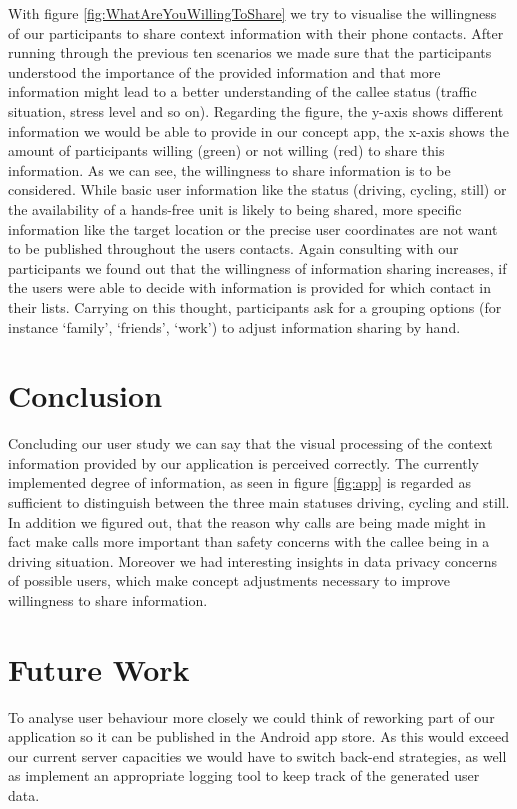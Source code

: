 \documentclass{sigchi}
\begin{document}
With figure \ref{fig:WhatAreYouWillingToShare} we try to visualise the willingness of our participants to share context information with their phone contacts. After running through the previous ten scenarios we made sure that the participants understood the importance of the provided information and that more information might lead to a better understanding of the callee status (traffic situation, stress level and so on). Regarding the figure, the y-axis shows different information we would be able to provide in our concept app, the x-axis shows the amount of participants willing (green) or not willing (red) to share this information. As we can see, the willingness to share information is to be considered. While basic user information like the status (driving, cycling, still) or the availability of a hands-free unit is likely to being shared, more specific information like the target location or the precise user coordinates are not want to be published throughout the users contacts. Again consulting with our participants we found out that the willingness of information sharing increases, if the users were able to decide with information is provided for which contact in their lists. Carrying on this thought, participants ask for a grouping options (for instance `family', `friends', `work') to adjust information sharing by hand.


\section{Conclusion}
Concluding our user study we can say that the visual processing of the context information provided by our application is perceived correctly. The currently implemented degree of information, as seen in figure \ref{fig:app} is regarded as sufficient to distinguish between the three main statuses driving, cycling and still. In addition we figured out, that the reason why calls are being made might in fact make calls more important than safety concerns with the callee being in a driving situation. Moreover we had interesting insights in data privacy concerns of possible users, which make concept adjustments necessary to improve willingness to share information.

\section{Future Work}
To analyse user behaviour more closely we could think of reworking part of our application so it can be published in the Android app store. As this would exceed our current server capacities we would have to switch back-end strategies, as well as implement an appropriate logging tool to keep track of the generated user data.

\balance{}


\balance{}



\end{document}
